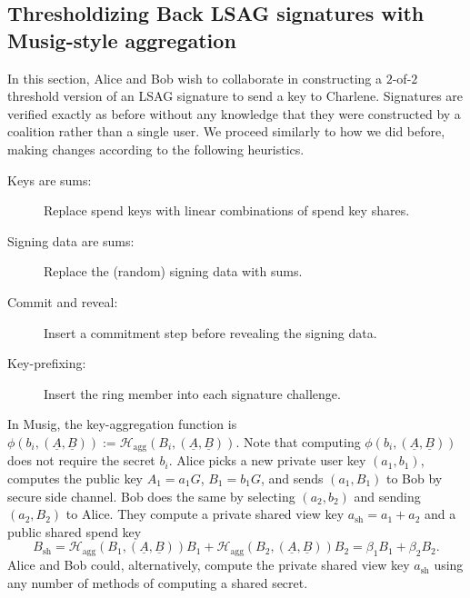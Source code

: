 \documentclass{mrl}
\theoremstyle{definition}
\numberwithin{theorem}{subsection}
\begin{document}
\subsection{Thresholdizing Back LSAG signatures with Musig-style aggregation} \label{naiveImplement}

In this section, Alice and Bob wish to collaborate in constructing a $2$-of-$2$ threshold version of an LSAG signature to send a key to Charlene. Signatures are verified exactly as before without any knowledge that they were constructed by a coalition rather than a single user. We proceed similarly to how we did before, making changes according to the following heuristics.
\begin{description}
\item [Keys are sums:] Replace spend keys with linear combinations of spend key shares.

\item [Signing data are sums:] Replace the (random) signing data with sums.

\item [Commit and reveal:] Insert a commitment step before revealing the signing data.

\item [Key-prefixing:] Insert the ring member into each signature challenge.
\end{description} 

In Musig, the key-aggregation function is $\phi(b_i, (\underline{A},\underline{B})) := \mathcal{H}_{\text{agg}}(B_i, (\underline{A}, \underline{B}))$. Note that computing $\phi(b_i, (\underline{A}, \underline{B}))$ does not require the secret $b_i$. Alice picks a new private user key $(a_1, b_1)$, computes the public key $A_1 = a_1 G$, $B_1 = b_1G$, and sends $(a_1, B_1)$ to Bob by secure side channel. Bob does the same by selecting $(a_2, b_2)$ and sending $(a_2, B_2)$ to Alice.  They compute a private shared view key $a_{\text{sh}} = a_1 + a_2$ and a public shared spend key \[B_{\text{sh}} = \mathcal{H}_{\text{agg}}(B_1, (\underline{A}, \underline{B}))B_1 + \mathcal{H}_{\text{agg}}(B_2, (\underline{A}, \underline{B}))B_2 = \beta_1 B_1 + \beta_2 B_2.\] Alice and Bob could, alternatively, compute the private shared view key $a_{\text{sh}}$ using any number of methods of computing a shared secret. 
\end{document}
